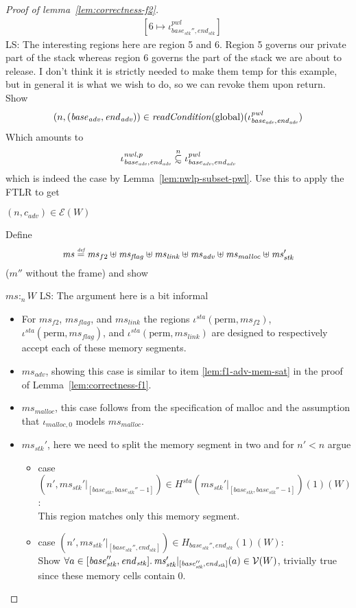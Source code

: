 \documentclass[a4paper]{article}
\newcommand{\defeq}{\stackrel{\textit{\tiny{def}}}{=}}
\newcommand\subsetsim{\mathrel{\ooalign{\raise.2ex\hbox{$\subset$}\cr
      \hidewidth\lower.8ex\hbox{\scalebox{0.9}{$\sim$}}\hidewidth\cr}}}
\newcommand{\nsubsim}[1][n]{\stackrel{\tiny{#1}}{\subsetsim}}
\newcommand\lau[1]{{\color{purple} \sf \footnotesize {LS: #1}}\\}
\newcommand{\var}[1]{\mathit{#1}}
\newcommand{\hs}{\var{ms}}
\newcommand{\ms}{\hs}
\newcommand{\start}{\var{base}}
\newcommand{\addrend}{\var{end}}
\newcommand{\heap}{\var{mem}}
\newcommand{\adv}{\var{adv}}
\newcommand{\link}{\var{link}}
\newcommand{\stk}{\var{stk}}
\newcommand{\flag}{\var{flag}}
\newcommand{\nwl}{\var{nwl}}
\newcommand{\pwl}{\var{pwl}}
\newcommand{\sta}{\var{sta}}
\newcommand{\plainfun}[2]{
  \ifthenelse{\equal{#2}{}}
  {\mathit{#1}}
  {\mathit{#1}(#2)}
}
\newcommand{\readCond}[1]{\plainfun{readCondition}{#1}}
\newcommand{\heapSat}[3][\heap]{#1 :_{#2} #3}
\newcommand{\codelabel}[1]{\mathit{#1}}
\newcommand{\malloc}{\codelabel{malloc}}
\newcommand{\asmType}{\plaindom{AsmType}}
\newcommand{\plaindom}[1]{\mathrm{#1}}
\newcommand{\intr}[2]{\mathcal{#1}}
\newcommand{\valueintr}[1]{\intr{V}{#1}}
\newcommand{\exprintr}[1]{\intr{E}{#1}}
\newcommand{\stdvr}{\valueintr{\asmType}}
\newcommand{\stder}{\exprintr{\asmType}}
\newcommand{\npair}[2][n]{\left(#1,#2 \right)}
\newcommand{\plainperm}[1]{\mathrm{#1}}
\newcommand{\glob}{\plainperm{global}}
\newcommand{\plainview}[1]{\mathrm{#1}}
\newcommand{\perma}{\plainview{perm}}
\newcommand{\temp}{\plainview{temp}}
\begin{document}
\begin{proof}[Proof of lemma~\ref{lem:correctness-f2}]
\begin{align*}
          & [6 \mapsto \iota^\pwl_{\start_\stk'', \addrend_\stk}]
  \end{align*}
  \lau{The interesting regions here are region 5 and 6. Region 5 governs our private part of the stack whereas region 6 governs the part of the stack we are about to release. I don't think it is strictly needed to make them $\temp$ for this example, but in general it is what we wish to do, so we can revoke them upon return.}
  Show
  \[
    \npair{(\start_\adv,\addrend_\adv)}\in\readCond{}(\glob)(\iota^\pwl_{\start_\adv,\addrend_\adv})
  \]
  Which amounts to
  \[
    \iota^{\nwl,p}_{\start_\adv,\addrend_\adv} \nsubsim[n] \iota^\pwl_{\start_\adv,\addrend_\adv}
  \]
  which is indeed the case by Lemma~\ref{lem:nwlp-subset-pwl}. Use this to apply the FTLR to get 
  \begin{enumproof}
  \item $\npair{c_\adv} \in \stder(W)$ \label{lem:f2-adv-er}
  \end{enumproof}
  Define
  \[
    \ms  \defeq \hs_{f2} \uplus 
    \hs_\flag \uplus                
    \ms_\link \uplus 
    \hs_\adv \uplus 
    \ms_\malloc \uplus 
    \ms_\stk'
  \]
  ($m''$ without the frame) and show
  \begin{enumproof}[resume]
  \item $\heapSat[\ms]{n}{W}$ \label{lem:f2-mem-sat}\lau{The argument here is a bit informal}
    \begin{itemize}
    \item For $\hs_{f2}$, $\hs_\flag$, and $\ms_\link$ the regions $\iota^\sta(\perma,\ms_{f2})$,$\iota^\sta (\perma,\ms_\flag)$, and $\iota^\sta (\perma,\ms_\link)$ are designed to respectively accept each of these memory segments.
    \item $\hs_\adv$, showing this case is similar to item \ref{lem:f1-adv-mem-sat} in the proof of Lemma~\ref{lem:correctness-f1}.
    \item $\ms_\malloc$, this case follows from the specification of malloc and the assumption that $\iota_{\malloc,0}$ models $\ms_\malloc$.    
    \item $\ms_\stk'$, here we need to split the memory segment in two and for $n' < n$ argue
      \begin{itemize}
      \item case $\npair[n']{\ms_\stk'|_{[\start_\stk, \start_\stk''-1]}} \in
        H^\sta(\ms_\stk'|_{[\start_\stk,\start_\stk''-1]})(1)(W)$ :\\ This region matches only this memory segment.
      \item case $\npair[n']{\ms_\stk'|_{[\start_\stk'', \addrend_\stk]}} \in H_{\start_\stk'', \addrend_\stk}(1)(W)$:\\ Show $\forall a \in [\start_\stk'', \addrend_\stk] \ldotp \ms_\stk'|_{[\start_\stk'', \addrend_\stk]}(a) \in \stdvr(W)$, trivially true since these memory cells contain 0. 

\end{itemize}
\end{itemize}
\end{enumproof}
\end{proof}
\end{document}
